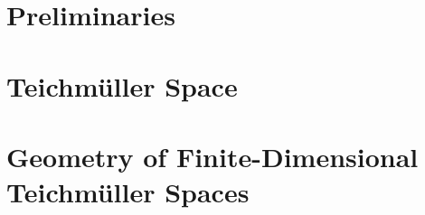 \documentclass[Total.tex]{subfiles}
\begin{document}
	\chapter{Preliminaries}
	\chapter{Teichm\"uller Space}
	\chapter{Geometry of Finite-Dimensional Teichm\"uller Spaces}
\end{document}
